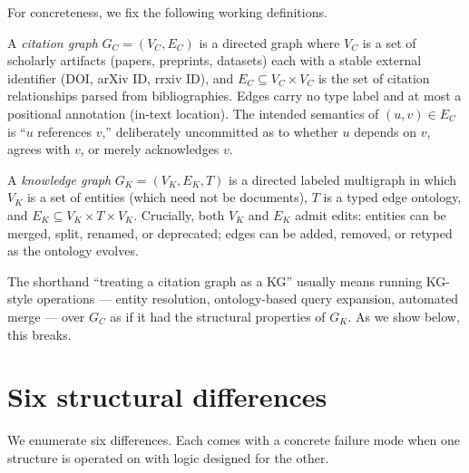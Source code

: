 \documentclass{rrxiv}
\begin{document}
For concreteness, we fix the following working definitions.

A \emph{citation graph} $G_C = (V_C, E_C)$ is a directed graph where $V_C$ is a set of scholarly artifacts (papers, preprints, datasets) each with a stable external identifier (DOI, arXiv ID, rrxiv ID), and $E_C \subseteq V_C \times V_C$ is the set of citation relationships parsed from bibliographies. Edges carry no type label and at most a positional annotation (in-text location). The intended semantics of $(u, v) \in E_C$ is ``$u$ references $v$,'' deliberately uncommitted as to whether $u$ depends on $v$, agrees with $v$, or merely acknowledges $v$.

A \emph{knowledge graph} $G_K = (V_K, E_K, T)$ is a directed labeled multigraph in which $V_K$ is a set of entities (which need not be documents), $T$ is a typed edge ontology, and $E_K \subseteq V_K \times T \times V_K$. Crucially, both $V_K$ and $E_K$ admit edits: entities can be merged, split, renamed, or deprecated; edges can be added, removed, or retyped as the ontology evolves.

The shorthand ``treating a citation graph as a KG'' usually means running KG-style operations --- entity resolution, ontology-based query expansion, automated merge --- over $G_C$ as if it had the structural properties of $G_K$. As we show below, this breaks.

\section{Six structural differences}\label{sec:six-differences}

We enumerate six differences. Each comes with a concrete failure mode when one structure is operated on with logic designed for the other.
\end{document}
